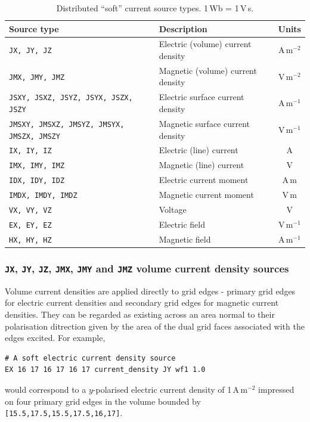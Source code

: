 \documentclass[onecolumn,a4paper]{article}
\numberwithin{equation}{section}
\begin{document}
\begin{table}[ht]
\begin{center}
\begin{tabular}{|l|l|c|}\hline
Source type                                       &Description                        &Units       \\
\hline
\texttt{JX, JY, JZ}                               &Electric (volume) current density  &A\,m$^{-2}$ \\
\texttt{JMX, JMY, JMZ}                            &Magnetic (volume) current density  &V\,m$^{-2}$ \\
\texttt{JSXY, JSXZ, JSYZ, JSYX, JSZX, JSZY}       &Electric surface current density   &A\,m$^{-1}$ \\
\texttt{JMSXY, JMSXZ, JMSYZ, JMSYX, JMSZX, JMSZY} &Magnetic surface current density   &V\,m$^{-1}$ \\
\texttt{IX, IY, IZ}                               &Electric (line) current            &A           \\
\texttt{IMX, IMY, IMZ}                            &Magnetic (line) current            &V           \\
\texttt{IDX, IDY, IDZ}                            &Electric current moment            &A\,m        \\
\texttt{IMDX, IMDY, IMDZ}                         &Magnetic current moment            &V\,m        \\
\texttt{VX, VY, VZ}                               &Voltage                            &V           \\
\texttt{EX, EY, EZ}                               &Electric field                     &V\,m$^{-1}$ \\
\texttt{HX, HY, HZ}                               &Magnetic field                     &A\,m$^{-1}$ \\
\hline
\end{tabular}
\caption{\label{tb:exsoft}Distributed ``soft'' current source types. 1\,Wb = 1\,V\,s.}
\end{center}
\end{table}

\subsubsection{\texttt{JX}, \texttt{JY}, \texttt{JZ}, \texttt{JMX}, \texttt{JMY} and \texttt{JMZ} volume current density sources}

Volume current densities are applied directly to grid edges - primary grid edges for electric current densities and secondary grid 
edges for magnetic current densities. They can be regarded as existing across an area normal to their polarisation ditrection
given by the area of the dual grid faces associated with the edges excited.
For example,
\begin{verbatim}
# A soft electric current density source
EX 16 17 16 17 16 17 current_density JY wf1 1.0
\end{verbatim}
would correspond to a $y$-polarised electric current density of 1\,A\,m$^{-2}$ impressed on four primary
grid edges in the volume bounded by \texttt{[15.5,17.5,15.5,17.5,16,17]}.
\end{document}
